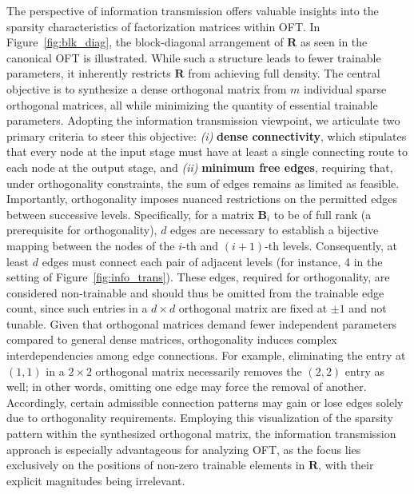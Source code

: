 The perspective of information transmission offers valuable insights into the sparsity characteristics of factorization matrices within OFT. In Figure~\ref{fig:blk_diag}, the block-diagonal arrangement of $\bm{R}$ as seen in the canonical OFT is illustrated. While such a structure leads to fewer trainable parameters, it inherently restricts $\bm{R}$ from achieving full density. The central objective is to synthesize a dense orthogonal matrix from $m$ individual sparse orthogonal matrices, all while minimizing the quantity of essential trainable parameters. Adopting the information transmission viewpoint, we articulate two primary criteria to steer this objective: \emph{(i)} \textbf{dense connectivity}, which stipulates that every node at the input stage must have at least a single connecting route to each node at the output stage, and \emph{(ii)} \textbf{minimum free edges}, requiring that, under orthogonality constraints, the sum of edges remains as limited as feasible. Importantly, orthogonality imposes nuanced restrictions on the permitted edges between successive levels. Specifically, for a matrix $\bm{B}_i$ to be of full rank (a prerequisite for orthogonality), $d$ edges are necessary to establish a bijective mapping between the nodes of the $i$-th and $(i+1)$-th levels. Consequently, at least $d$ edges must connect each pair of adjacent levels (for instance, 4 in the setting of Figure~\ref{fig:info_trans}). These edges, required for orthogonality, are considered non-trainable and should thus be omitted from the trainable edge count, since such entries in a $d \times d$ orthogonal matrix are fixed at $\pm 1$ and not tunable. Given that orthogonal matrices demand fewer independent parameters compared to general dense matrices, orthogonality induces complex interdependencies among edge connections. For example, eliminating the entry at $(1,1)$ in a $2 \times 2$ orthogonal matrix necessarily removes the $(2,2)$ entry as well; in other words, omitting one edge may force the removal of another. Accordingly, certain admissible connection patterns may gain or lose edges solely due to orthogonality requirements. Employing this visualization of the sparsity pattern within the synthesized orthogonal matrix, the information transmission approach is especially advantageous for analyzing OFT, as the focus lies exclusively on the positions of non-zero trainable elements in $\bm{R}$, with their explicit magnitudes being irrelevant.

